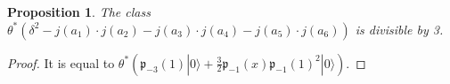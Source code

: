 \documentclass{amsart}
\newcommand{\vac}{|0\rangle}
\newcommand{\p}{\mathfrak{p}}
\newcommand{\pone}{ \mathfrak{p}_{ - 1} }
\theoremstyle{plain}
\newtheorem{proposition}[theorem]{Proposition}
\theoremstyle{definition}
\theoremstyle{remark}
\begin{document}
\begin{proposition}
The class $\theta^*\left(\delta^2 - j(a_1)\cdot j(a_2)- j(a_3)\cdot j(a_4)- j(a_5)\cdot j(a_6)\right)$ is divisible by 3.
\end{proposition}
\begin{proof}
It is equal to $\theta^*\left(\p_{-3}(1)\vac +\frac{3}{2}\pone(x)\pone(1)^2\vac \right)$.
\end{proof}





\end{document}

